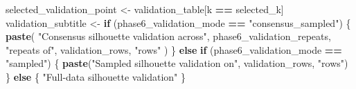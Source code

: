 \documentclass[
]{article}
\newenvironment{Shaded}{\begin{snugshade}}{\end{snugshade}}
\newcommand{\ControlFlowTok}[1]{\textcolor[rgb]{0.13,0.29,0.53}{\textbf{#1}}}
\newcommand{\FunctionTok}[1]{\textcolor[rgb]{0.13,0.29,0.53}{\textbf{#1}}}
\newcommand{\NormalTok}[1]{#1}
\newcommand{\OtherTok}[1]{\textcolor[rgb]{0.56,0.35,0.01}{#1}}
\newcommand{\SpecialCharTok}[1]{\textcolor[rgb]{0.81,0.36,0.00}{\textbf{#1}}}
\newcommand{\StringTok}[1]{\textcolor[rgb]{0.31,0.60,0.02}{#1}}
\begin{document}
\begin{Shaded}
\begin{Highlighting}[]
\NormalTok{selected\_validation\_point }\OtherTok{\textless{}{-}}\NormalTok{ validation\_table[k }\SpecialCharTok{==}\NormalTok{ selected\_k]}
\NormalTok{validation\_subtitle }\OtherTok{\textless{}{-}} \ControlFlowTok{if}\NormalTok{ (phase6\_validation\_mode }\SpecialCharTok{==} \StringTok{"consensus\_sampled"}\NormalTok{) \{}
  \FunctionTok{paste}\NormalTok{(}
    \StringTok{"Consensus silhouette validation across"}\NormalTok{,}
\NormalTok{    phase6\_validation\_repeats,}
    \StringTok{"repeats of"}\NormalTok{,}
\NormalTok{    validation\_rows,}
    \StringTok{"rows"}
\NormalTok{  )}
\NormalTok{\} }\ControlFlowTok{else} \ControlFlowTok{if}\NormalTok{ (phase6\_validation\_mode }\SpecialCharTok{==} \StringTok{"sampled"}\NormalTok{) \{}
  \FunctionTok{paste}\NormalTok{(}\StringTok{"Sampled silhouette validation on"}\NormalTok{, validation\_rows, }\StringTok{"rows"}\NormalTok{)}
\NormalTok{\} }\ControlFlowTok{else}\NormalTok{ \{}
  \StringTok{"Full{-}data silhouette validation"}
\NormalTok{\}}


\end{Highlighting}
\end{Shaded}
\end{document}
